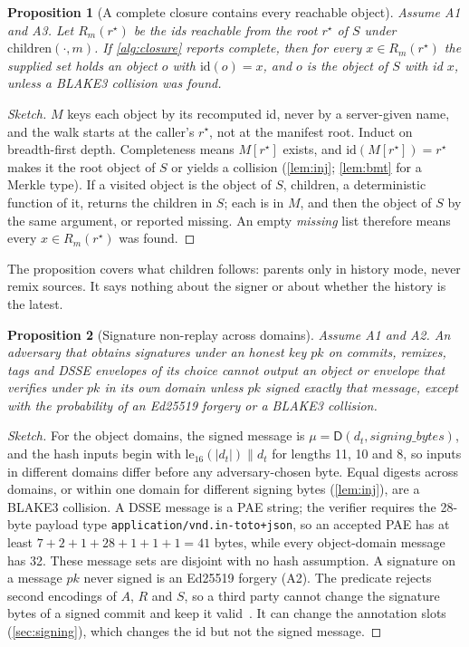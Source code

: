 \documentclass[10pt,letterpaper]{article}
\newtheorem{proposition}{Proposition}
\theoremstyle{remark}
\newcommand{\D}{\mathsf{D}}
\newcommand{\cc}{\mathbin{\|}}
\begin{document}
\begin{proposition}[A complete closure contains every reachable object]\label{prop:closure}
Assume A1 and A3. Let $R_m(r^\star)$ be the ids reachable from the root
$r^\star$ of $S$ under $\mathrm{children}(\cdot, m)$. If \cref{alg:closure}
reports \emph{complete}, then for every $x \in R_m(r^\star)$ the supplied set
holds an object $o$ with $\mathrm{id}(o) = x$, and $o$ is the object of $S$
with id $x$, unless a BLAKE3 collision was found.
\end{proposition}
\begin{proof}[Sketch]
$M$ keys each object by its recomputed id, never by a server-given name, and
the walk starts at the caller's $r^\star$, not at the manifest root. Induct on
breadth-first depth. Completeness means $M[r^\star]$ exists, and
$\mathrm{id}(M[r^\star]) = r^\star$ makes it the root object of $S$ or yields
a collision (\cref{lem:inj}; \cref{lem:bmt} for a Merkle type). If a visited
object is the object of $S$, $\mathrm{children}$, a deterministic function of
it, returns the children in $S$; each is in $M$, and then the object of $S$ by
the same argument, or reported missing. An empty \emph{missing} list therefore
means every $x \in R_m(r^\star)$ was found.
\end{proof}

The proposition covers what $\mathrm{children}$ follows: parents only in
history mode, never remix sources. It says nothing about the
signer or about whether the history is the latest.

\begin{proposition}[Signature non-replay across domains]\label{prop:replay}
Assume A1 and A2. An adversary that obtains signatures under an honest key
$\mathit{pk}$ on commits, remixes, tags and DSSE envelopes of its choice cannot
output an object or envelope that verifies under $\mathit{pk}$ in its own
domain unless $\mathit{pk}$ signed exactly that message, except with the
probability of an Ed25519 forgery or a BLAKE3 collision.
\end{proposition}
\begin{proof}[Sketch]
For the object domains, the signed message is
$\mu = \D(d_t, \mathit{signing\_bytes})$, and the hash inputs begin with
$\mathrm{le}_{16}(|d_t|) \cc d_t$ for lengths 11, 10 and 8, so inputs in
different domains differ before any adversary-chosen byte. Equal digests across
domains, or within one domain for different signing bytes (\cref{lem:inj}), are
a BLAKE3 collision. A DSSE message is a PAE string; the verifier requires the
28-byte payload type \texttt{application/vnd.in-toto+json}, so an accepted PAE
has at least $7 + 2 + 1 + 28 + 1 + 1 + 1 = 41$ bytes, while every object-domain
message has 32. These message sets are disjoint with no hash assumption. A
signature on a message $\mathit{pk}$ never signed is an Ed25519 forgery (A2).
The predicate rejects second encodings of $A$, $R$ and $S$, so a third party
cannot change the signature bytes of a signed commit and keep it
valid~\cite{taming}. It can change the annotation slots (\cref{sec:signing}),
which changes the id but not the signed message.
\end{proof}
\end{document}
